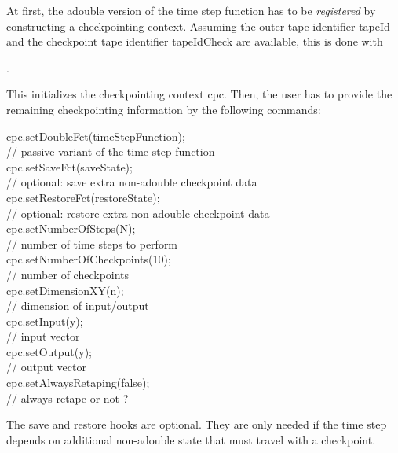 \documentclass[11pt,twoside]{article}
\begin{document}
At first, the {\sf adouble} version of the time step function has to
be {\em registered} by constructing a checkpointing context. Assuming the
outer tape identifier {\sf tapeId} and the checkpoint tape identifier
{\sf tapeIdCheck} are available, this is done with
\medskip

\noindent
\hspace*{2cm}{\sf ADOLC::CP::Context cpc(tapeId, tapeIdCheck, timeStepFunction);}.
\medskip

\noindent
This initializes the checkpointing context {\sf cpc}. Then,
the user has to provide the remaining checkpointing information
by the following commands:
\begin{tabbing}
\hspace*{2cm}\= {\sf cpc.setDoubleFct(timeStepFunction);}\\
             \> {\sf // passive variant of the time step function}\\
             \> {\sf cpc.setSaveFct(saveState);}\\
             \> {\sf // optional: save extra non-adouble checkpoint data}\\
             \> {\sf cpc.setRestoreFct(restoreState);}\\
             \> {\sf // optional: restore extra non-adouble checkpoint data}\\
             \> {\sf cpc.setNumberOfSteps(N);}\\
             \> {\sf // number of time steps to perform}\\
             \> {\sf cpc.setNumberOfCheckpoints(10);}\\
             \> {\sf // number of checkpoints} \\
             \> {\sf cpc.setDimensionXY(n);}\\
             \> {\sf // dimension of input/output}\\
             \> {\sf cpc.setInput(y);}\\
             \> {\sf // input vector} \\
             \> {\sf cpc.setOutput(y);}\\
             \> {\sf // output vector }\\
             \> {\sf cpc.setAlwaysRetaping(false);}\\
             \> {\sf // always retape or not ?}
\end{tabbing}
The save and restore hooks are optional. They are only needed if the time
step depends on additional non-{\sf adouble} state that must travel with a
checkpoint.
\end{document}
